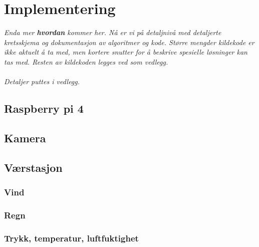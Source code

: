 \section{Implementering}
\label{sec:implementering}
\textit{Enda mer \textbf{hvordan} kommer her. Nå er vi på detaljnivå med detaljerte kretsskjema og dokumentasjon av algoritmer og kode. Større mengder kildekode er ikke aktuelt å ta med, men kortere snutter for å beskrive spesielle løsninger kan tas med. Resten av kildekoden legges ved som vedlegg. \\
\\
Detaljer puttes i vedlegg.}



\subsection{Raspberry pi 4}



\subsection{Kamera}


\subsection{Værstasjon}

\subsubsection{Vind}

\subsubsection{Regn}

\subsubsection{Trykk, temperatur, luftfuktighet}

